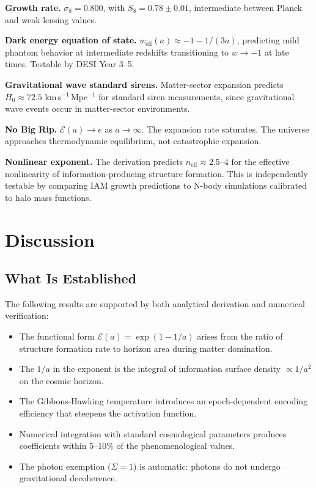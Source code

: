\documentclass[twocolumn,superscriptaddress,prl,amsmath,amssymb]{revtex4-2}
\begin{document}
\textbf{Growth rate.} $\sigma_8 = 0.800$, with $S_8 = 0.78 \pm 0.01$, intermediate between Planck and weak lensing values.

\textbf{Dark energy equation of state.} $w_\text{eff}(a) \approx -1 - 1/(3a)$, predicting mild phantom behavior at intermediate redshifts transitioning to $w \to -1$ at late times. Testable by DESI Year 3--5.

\textbf{Gravitational wave standard sirens.} Matter-sector expansion predicts $H_0 \approx 72.5$ km\,s$^{-1}$\,Mpc$^{-1}$ for standard siren measurements, since gravitational wave events occur in matter-sector environments.

\textbf{No Big Rip.} $\mathcal{E}(a) \to e$ as $a \to \infty$. The expansion rate saturates. The universe approaches thermodynamic equilibrium, not catastrophic expansion.

\textbf{Nonlinear exponent.} The derivation predicts $n_\text{eff} \approx 2.5$--$4$ for the effective nonlinearity of information-producing structure formation. This is independently testable by comparing IAM growth predictions to N-body simulations calibrated to halo mass functions.

\section{Discussion}
\label{sec:discussion}

\subsection{What Is Established}

The following results are supported by both analytical derivation and numerical verification:
\begin{itemize}
\item The functional form $\mathcal{E}(a) = \exp(1-1/a)$ arises from the ratio of structure formation rate to horizon area during matter domination.
\item The $1/a$ in the exponent is the integral of information surface density $\propto 1/a^2$ on the cosmic horizon.
\item The Gibbons-Hawking temperature introduces an epoch-dependent encoding efficiency that steepens the activation function.
\item Numerical integration with standard cosmological parameters produces coefficients within 5--10\% of the phenomenological values.
\item The photon exemption ($\Sigma = 1$) is automatic: photons do not undergo gravitational decoherence.
\end{itemize}
\end{document}
